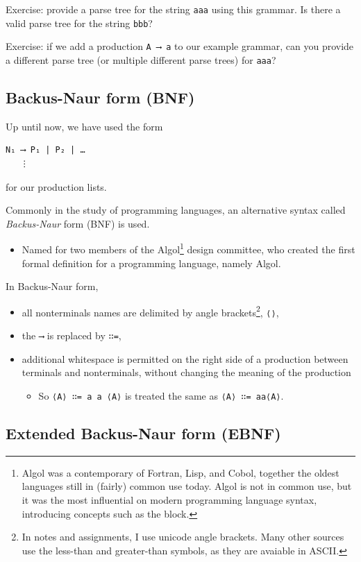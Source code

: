 \documentclass[11pt]{article}
\theoremstyle{definition}
\begin{document}
Exercise: provide a parse tree for the string \texttt{aaa} using this grammar.
Is there a valid parse tree for the string \texttt{bbb}?

Exercise: if we add a production \texttt{A ⟶ a} to our example grammar,
can you provide a different parse tree
(or multiple different parse trees) for \texttt{aaa}?

\subsection{Backus-Naur form (BNF)}
\label{sec:orgca72791}

Up until now, we have used the form
\begin{verbatim}
N₁ ⟶ P₁ | P₂ | …
   ⋮
\end{verbatim}
for our production lists.

Commonly in the study of programming languages,
an alternative syntax called \emph{Backus-Naur} form (BNF)
is used.
\begin{itemize}
\item Named for two members of the Algol\footnote{Algol was a contemporary of Fortran, Lisp, and Cobol,
together the oldest languages still in (fairly) common use today.
Algol is not in common use, but it was the most influential on
modern programming language syntax, introducing concepts such as
the block.} design committee,
who created the first formal definition for a programming language,
namely Algol.
\end{itemize}

In Backus-Naur form,
\begin{itemize}
\item all nonterminals names are delimited by
angle brackets\footnote{In notes and assignments, I use unicode angle brackets.
Many other sources use the less-than and greater-than symbols,
as they are avaiable in ASCII.}, \texttt{⟨⟩},
\item the \texttt{⟶} is replaced by \texttt{∷=},
\item additional whitespace is permitted on the right side
of a production between terminals and nonterminals,
without changing the meaning of the production
\begin{itemize}
\item So \texttt{⟨A⟩ ∷= a a ⟨A⟩} is treated the same as \texttt{⟨A⟩ ∷= aa⟨A⟩}.
\end{itemize}
\end{itemize}

\subsection{Extended Backus-Naur form (EBNF)}
\label{sec:orge9c8d4c}
\end{document}
